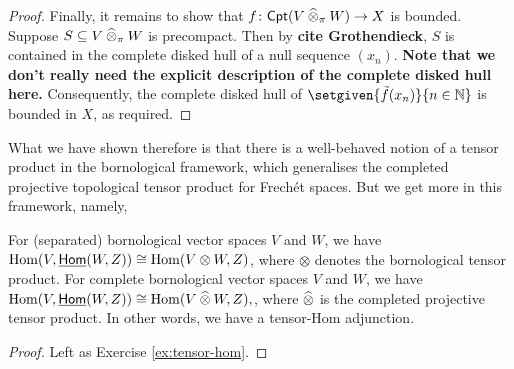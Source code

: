 \begin{proof}
Finally, it remains to show that \(f \colon \mathsf{Cpt}(V \mathbin{\widehat{\otimes}}_\pi W) \to X\) is bounded. Suppose \(S \subseteq V \mathbin{\widehat{\otimes}}_{\pi} W\) is precompact. Then by \textbf{cite Grothendieck}, \(S\) is contained in the complete disked hull of a null sequence \((x_n)\). \textbf{Note that we don't really need the explicit description of the complete disked hull here.} Consequently, the complete disked hull of \(\setgiven{\tilde{f}(x_n)}{n \in \N}\) is bounded in \(X\), as required. 
\end{proof}


What we have shown therefore is that there is a well-behaved notion of a tensor product in the bornological framework, which generalises the completed projective topological tensor product for Frech\'et spaces. But we get more in this framework, namely, 

\begin{theorem} \label{thm:tensor-hom}
    For (separated) bornological vector spaces \(V\) and \(W\), we have \(\operatorname{Hom}(V, \underline{\mathsf{Hom}}(W,Z)) \cong \operatorname{Hom}(V \otimes W, Z)\), where \(\otimes\) denotes the bornological tensor product. For complete bornological vector spaces \(V\) and \(W\), we have \(\operatorname{Hom}(V, \underline{\mathsf{Hom}}(W,Z)) \cong \operatorname{Hom}(V \mathbin{\widehat{\otimes}} W, Z),\), where \(\mathbin{\widehat{\otimes}}\) is the completed projective tensor product. In other words, we have a tensor-Hom adjunction. 
\end{theorem}
\begin{proof} Left as Exercise \ref{ex:tensor-hom}. 
\end{proof}